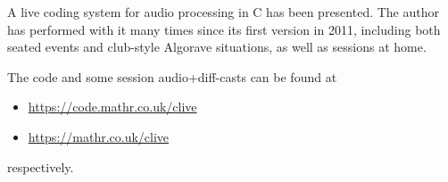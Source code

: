 \documentclass[11pt,a4paper]{article}
\begin{document}
A live coding system for audio processing in C has been presented. The
author has performed with it many times since its first version in 2011,
including both seated events and club-style Algorave situations, as well
as sessions at home.

The code and some session audio+diff-casts can be found at
\begin{itemize}
\item \url{https://code.mathr.co.uk/clive}
\item \url{https://mathr.co.uk/clive}
\end{itemize}
respectively.



\end{document}
